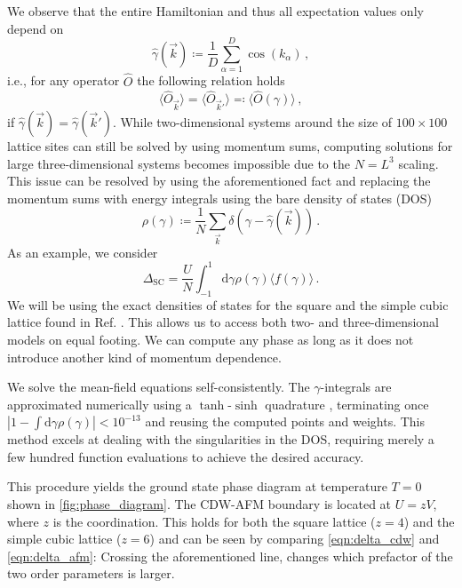 \documentclass[
    reprint, 
    aps,
    preprintnumbers,
    twocolumn,
    prb,
    superscriptaddress
]{revtex4-2}
\newcommand{\vk}{\vec{k}}
\newcommand{\dgamma}{\mathrm{d}\gamma}
\begin{document}
We observe that the entire Hamiltonian and thus all expectation values only depend on
\begin{equation}
    \hat{\gamma}(\vk) \coloneqq \frac{1}{D} \sum_{\alpha=1}^D \cos(k_\alpha)\,,
\end{equation}
i.e., for any operator $\hat{O}$ the following relation holds 
\begin{equation}
    \label{eqn:equal_expecs}
    \langle \hat{O}_{\vk} \rangle = \langle \hat{O}_{\vk'} \rangle \eqqcolon \langle \hat{O}( \gamma ) \rangle\,,
\end{equation}
if $\hat{\gamma}(\vk) = \hat{\gamma}(\vk')$.
While two-dimensional systems around the size of $100\times100$ lattice sites can still be solved by using momentum sums,
computing solutions for large three-dimensional systems becomes impossible due to the $N=L^3$ scaling.
This issue can be resolved by using the aforementioned fact and replacing the momentum sums with energy integrals using the bare density of states (DOS)
\begin{equation}
    \rho(\gamma) \coloneqq  \frac{1}{N} \sum_{\vk} \delta \left(\gamma - \hat{\gamma} (\vk) \right)\,.
\end{equation}
As an example, we consider 
\begin{equation}
    \Delta_\text{SC} = \frac{U}{N} \int_{-1}^{1} \dgamma \rho(\gamma) \langle f( \gamma ) \rangle\,.
\end{equation}
We will be using the exact densities of states for the square and the simple cubic lattice found in Ref. \cite{Hanisch97}.
This allows us to access both two- and three-dimensional models on equal footing.
We can compute any phase as long as it does not introduce another kind of momentum dependence.

We solve the mean-field equations self-consistently.
The $\gamma$-integrals are approximated numerically using a $\tanh$-$\sinh$ quadrature \cite{takahasi73}, 
terminating once $|1 - \int \dgamma \rho(\gamma)| < 10^{-13}$ and reusing the computed points and weights.
This method excels at dealing with the singularities in the DOS, 
requiring merely a few hundred function evaluations to achieve the desired accuracy.

This procedure yields the ground state phase diagram at temperature $T=0$ shown in \autoref{fig:phase_diagram}.
The CDW-AFM boundary is located at $U = zV$, where $z$ is the coordination.
This holds for both the square lattice ($z=4$) and the simple cubic lattice ($z=6$) and can be seen by comparing \eqref{eqn:delta_cdw} and \eqref{eqn:delta_afm}:
Crossing the aforementioned line, changes which prefactor of the two order parameters is larger.
\end{document}
